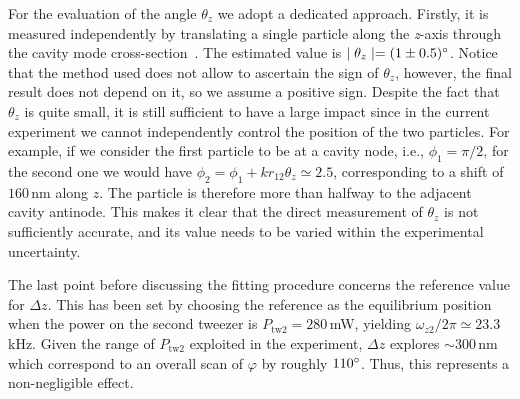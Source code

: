 \documentclass[aps,PRA,%
 amsmath,amssymb,
singlecolumn,
notitlepage,superscriptaddress,groupedaddress]{revtex4}
\begin{document}
For the evaluation of the angle $\theta_z$ we adopt a dedicated approach. Firstly, it is measured independently  by translating a single particle along the \emph{z}-axis through the cavity mode cross-section~\cite{Ranfagni2021Vectorial}.  The estimated value is $\mid\theta_z\mid=(1\pm0.5)\degree$. Notice that the method used does not allow to ascertain the sign of $\theta_z$, however, the final result does not depend on it, so we assume a positive sign. Despite the fact that $\theta_z$ is quite small, it is still sufficient to have a large impact since in the current experiment we cannot independently control the position of the two particles. For example, if we consider the first particle to be at a cavity node, i.e., $\phi_1=\pi/2$, for the second one we would have $\phi_2=\phi_1+k r_{12}\theta_z\simeq2.5$, corresponding to a shift of $160$\,nm along $z$. The particle is therefore more than halfway to the adjacent cavity antinode. This makes it clear that the direct measurement of $\theta_z$ is not sufficiently accurate, and its value needs to be varied within the experimental uncertainty.

The last point before discussing the fitting procedure concerns the reference value for $\Delta z$. This has been set by choosing the reference as the equilibrium position when the power on the second tweezer is $P_{\mathrm{tw2}}=280$\,mW, yielding $\omega_{z2}/2\pi\simeq23.3$\,kHz. Given the range of $P_{\mathrm{tw2}}$ exploited in the experiment, $\Delta z$ explores $\sim300$\,nm which correspond to an overall scan  of $\varphi$   by roughly   $110\degree$. Thus, this represents a non-negligible effect.
\end{document}
